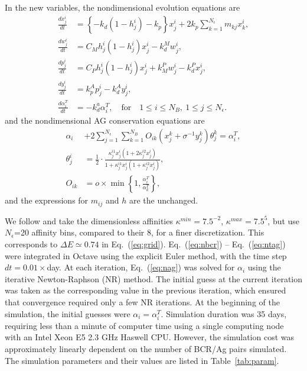 \documentclass[utf8]{frontiersHLTH}%
\newcommand{\td}[2]{\frac{d {#1}}{d {#2}}}
\newcommand{\eq}[1] {Eq.~(\ref{eq:#1})}
\newcommand{\tab}[1]{Table~\ref{tab:#1}}
\begin{document}
In the new variables, the nondimensional evolution equations are
\begin{align}
 \td{x^i_j}{t}&=\left\{-k_d(1-h^i_j) - k_p\right\}x^i_j + 2k_p\sum^{N_\epsilon}_{k=1} m_{kj} x^i_k,\label{eq:nbcr}\\
 \td{w^i_j}{t}&= C_{M} h^i_j(1-h^i_j)x^i_j - k^M_d w^i_j,\label{eq:nmbc}\\
 \td{p^i_j}{t}&= C_{P} h^i_j(1-h^i_j)x^i_j + k^{P}_M w^i_j - k^{P}_d x^i_j,\label{eq:npc}\\
 \td{y^i_j}{t}&= k_p^A p^i_j - k^A_d y^i_j,\label{eq:nab}\\
 \td{\alpha^T_i}{t}&=-k_d^a \alpha^T_i,\label{eq:ntag}\quad \textrm{for}\quad 1\le i\le N_B,\ 1\le j\le N_\epsilon.
\end{align}
and the nondimensional AG conservation equations are
\begin{align}
 \alpha_i &+2\sum^{N_\epsilon}_{j=1} \sum^{N_B}_{k=1} O_{ik}(x^k_j+\sigma^{-1}y^k_j)\theta^{k}_j=\alpha^T_i,\label{eq:nag}\\
 \theta^{i}_j&=\frac{1}{2}\cdot\frac{\kappa^{i1}_j x^i_j(1+2\kappa^{i2}_j x^i_j)}{1+\kappa^{i1}_j x^i_j(1+\kappa^{i2}_j x^i_j)},\label{eq:ntheta}\\
 O_{ik} &= o \times \min\left\{1,\frac{\alpha^T_i}{\alpha^T_k}\right\},\label{eq:nocc}
\end{align}
and the expressions for $m_{ij}$ and $h$ are the unchanged.

We follow \citet{kepler93} and take the dimensionless affinities $\kappa^{min}=7.5^{-2}$, $\kappa^{max}=7.5^5$,
but use $N_\epsilon$=20 affinity bins, compared to their 8, for a finer discretization. This corresponds to $\Delta E\simeq 0.74$
in \eq{grid}.
\eq{nbcr} -- \eq{ntag} were integrated in Octave\cite{octave} using the
explicit Euler method,\cite{Moin01} with the time step
$dt=0.01\times$day. At each iteration, \eq{nag} was solved for $\alpha_i$ using
the iterative Newton-Raphson (NR) method\cite{numrec}. The initial guess
at the current iteration was taken as the corresponding value in the
previous iteration, which ensured that convergence required only a few NR
iterations. At the beginning of the simulation, the initial guesses were
$\alpha_i=\alpha_i^T$. Simulation duration was 35 days,
requiring less than a minute of computer time using a single computing node with an Intel Xeon E5 2.3 GHz Haswell CPU.
However, the simulation cost was approximately linearly dependent on the
number of BCR/Ag pairs simulated.
%
The simulation parameters and their values are listed in \tab{param}.
\end{document}
